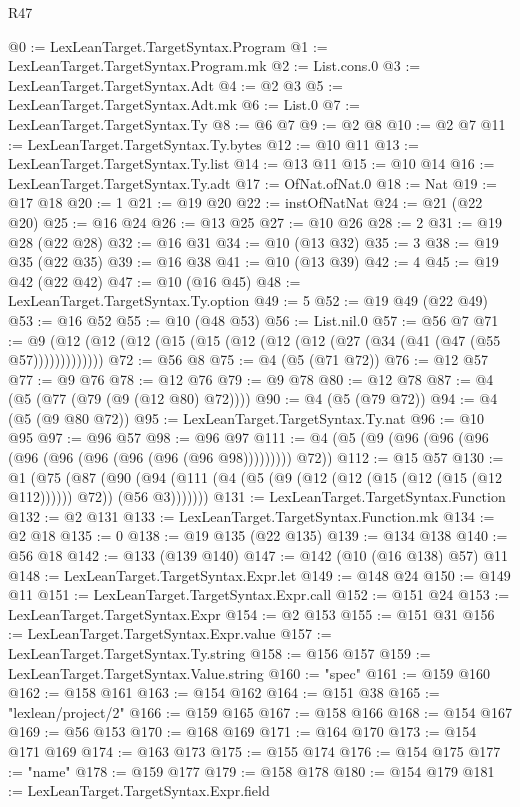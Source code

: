 \begin{lexlean}{R47}
\begin{coremodule}
@0 := LexLeanTarget.TargetSyntax.Program
@1 := LexLeanTarget.TargetSyntax.Program.mk
@2 := List.cons.{0}
@3 := LexLeanTarget.TargetSyntax.Adt
@4 := @2 @3
@5 := LexLeanTarget.TargetSyntax.Adt.mk
@6 := List.{0}
@7 := LexLeanTarget.TargetSyntax.Ty
@8 := @6 @7
@9 := @2 @8
@10 := @2 @7
@11 := LexLeanTarget.TargetSyntax.Ty.bytes
@12 := @10 @11
@13 := LexLeanTarget.TargetSyntax.Ty.list
@14 := @13 @11
@15 := @10 @14
@16 := LexLeanTarget.TargetSyntax.Ty.adt
@17 := OfNat.ofNat.{0}
@18 := Nat
@19 := @17 @18
@20 := 1
@21 := @19 @20
@22 := instOfNatNat
@24 := @21 (@22 @20)
@25 := @16 @24
@26 := @13 @25
@27 := @10 @26
@28 := 2
@31 := @19 @28 (@22 @28)
@32 := @16 @31
@34 := @10 (@13 @32)
@35 := 3
@38 := @19 @35 (@22 @35)
@39 := @16 @38
@41 := @10 (@13 @39)
@42 := 4
@45 := @19 @42 (@22 @42)
@47 := @10 (@16 @45)
@48 := LexLeanTarget.TargetSyntax.Ty.option
@49 := 5
@52 := @19 @49 (@22 @49)
@53 := @16 @52
@55 := @10 (@48 @53)
@56 := List.nil.{0}
@57 := @56 @7
@71 := @9 (@12 (@12 (@12 (@15 (@15 (@12 (@12 (@12 (@27 (@34 (@41 (@47 (@55 @57)))))))))))))
@72 := @56 @8
@75 := @4 (@5 (@71 @72))
@76 := @12 @57
@77 := @9 @76
@78 := @12 @76
@79 := @9 @78
@80 := @12 @78
@87 := @4 (@5 (@77 (@79 (@9 (@12 @80) @72))))
@90 := @4 (@5 (@79 @72))
@94 := @4 (@5 (@9 @80 @72))
@95 := LexLeanTarget.TargetSyntax.Ty.nat
@96 := @10 @95
@97 := @96 @57
@98 := @96 @97
@111 := @4 (@5 (@9 (@96 (@96 (@96 (@96 (@96 (@96 (@96 (@96 (@96 @98))))))))) @72))
@112 := @15 @57
@130 := @1
    (@75
      (@87 (@90 (@94 (@111 (@4 (@5 (@9 (@12 (@12 (@15 (@12 (@15 (@12 @112)))))) @72)) (@56 @3)))))))
@131 := LexLeanTarget.TargetSyntax.Function
@132 := @2 @131
@133 := LexLeanTarget.TargetSyntax.Function.mk
@134 := @2 @18
@135 := 0
@138 := @19 @135 (@22 @135)
@139 := @134 @138
@140 := @56 @18
@142 := @133 (@139 @140)
@147 := @142 (@10 (@16 @138) @57) @11
@148 := LexLeanTarget.TargetSyntax.Expr.let
@149 := @148 @24
@150 := @149 @11
@151 := LexLeanTarget.TargetSyntax.Expr.call
@152 := @151 @24
@153 := LexLeanTarget.TargetSyntax.Expr
@154 := @2 @153
@155 := @151 @31
@156 := LexLeanTarget.TargetSyntax.Expr.value
@157 := LexLeanTarget.TargetSyntax.Ty.string
@158 := @156 @157
@159 := LexLeanTarget.TargetSyntax.Value.string
@160 := "spec"
@161 := @159 @160
@162 := @158 @161
@163 := @154 @162
@164 := @151 @38
@165 := "lexlean/project/2"
@166 := @159 @165
@167 := @158 @166
@168 := @154 @167
@169 := @56 @153
@170 := @168 @169
@171 := @164 @170
@173 := @154 @171 @169
@174 := @163 @173
@175 := @155 @174
@176 := @154 @175
@177 := "name"
@178 := @159 @177
@179 := @158 @178
@180 := @154 @179
@181 := LexLeanTarget.TargetSyntax.Expr.field

\end{coremodule}
\end{lexlean}
